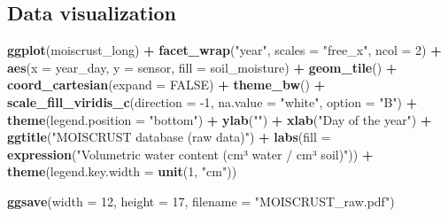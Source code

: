 \documentclass[]{article}
\newenvironment{Shaded}{\begin{snugshade}}{\end{snugshade}}
\newcommand{\DataTypeTok}[1]{\textcolor[rgb]{0.13,0.29,0.53}{#1}}
\newcommand{\DecValTok}[1]{\textcolor[rgb]{0.00,0.00,0.81}{#1}}
\newcommand{\KeywordTok}[1]{\textcolor[rgb]{0.13,0.29,0.53}{\textbf{#1}}}
\newcommand{\NormalTok}[1]{#1}
\newcommand{\OperatorTok}[1]{\textcolor[rgb]{0.81,0.36,0.00}{\textbf{#1}}}
\newcommand{\OtherTok}[1]{\textcolor[rgb]{0.56,0.35,0.01}{#1}}
\newcommand{\StringTok}[1]{\textcolor[rgb]{0.31,0.60,0.02}{#1}}
\begin{document}
\hypertarget{data-visualization}{%
\subsection{Data visualization}\label{data-visualization}}

\begin{Shaded}
\begin{Highlighting}[]
\KeywordTok{ggplot}\NormalTok{(moiscrust_long) }\OperatorTok{+}\StringTok{ }
\StringTok{  }\KeywordTok{facet_wrap}\NormalTok{(}\StringTok{"year"}\NormalTok{, }\DataTypeTok{scales =} \StringTok{"free_x"}\NormalTok{, }\DataTypeTok{ncol =} \DecValTok{2}\NormalTok{) }\OperatorTok{+}
\StringTok{  }\KeywordTok{aes}\NormalTok{(}\DataTypeTok{x =}\NormalTok{ year_day, }\DataTypeTok{y =}\NormalTok{ sensor, }\DataTypeTok{fill =}\NormalTok{ soil_moisture) }\OperatorTok{+}\StringTok{ }
\StringTok{  }\KeywordTok{geom_tile}\NormalTok{() }\OperatorTok{+}\StringTok{ }
\StringTok{  }\KeywordTok{coord_cartesian}\NormalTok{(}\DataTypeTok{expand =} \OtherTok{FALSE}\NormalTok{) }\OperatorTok{+}
\StringTok{  }\KeywordTok{theme_bw}\NormalTok{() }\OperatorTok{+}\StringTok{ }
\StringTok{  }\KeywordTok{scale_fill_viridis_c}\NormalTok{(}\DataTypeTok{direction =} \DecValTok{-1}\NormalTok{, }\DataTypeTok{na.value =} \StringTok{"white"}\NormalTok{, }\DataTypeTok{option =} \StringTok{"B"}\NormalTok{) }\OperatorTok{+}\StringTok{ }
\StringTok{  }\KeywordTok{theme}\NormalTok{(}\DataTypeTok{legend.position =} \StringTok{"bottom"}\NormalTok{) }\OperatorTok{+}\StringTok{ }
\StringTok{  }\KeywordTok{ylab}\NormalTok{(}\StringTok{""}\NormalTok{) }\OperatorTok{+}\StringTok{ }
\StringTok{  }\KeywordTok{xlab}\NormalTok{(}\StringTok{"Day of the year"}\NormalTok{) }\OperatorTok{+}
\StringTok{  }\KeywordTok{ggtitle}\NormalTok{(}\StringTok{"MOISCRUST database (raw data)"}\NormalTok{) }\OperatorTok{+}
\StringTok{  }\KeywordTok{labs}\NormalTok{(}\DataTypeTok{fill =} \KeywordTok{expression}\NormalTok{(}\StringTok{"Volumetric water content (cm³ water / cm³ soil)"}\NormalTok{)) }\OperatorTok{+}\StringTok{ }
\StringTok{  }\KeywordTok{theme}\NormalTok{(}\DataTypeTok{legend.key.width =} \KeywordTok{unit}\NormalTok{(}\DecValTok{1}\NormalTok{, }\StringTok{"cm"}\NormalTok{))}

\KeywordTok{ggsave}\NormalTok{(}\DataTypeTok{width =} \DecValTok{12}\NormalTok{, }\DataTypeTok{height =} \DecValTok{17}\NormalTok{, }\DataTypeTok{filename =} \StringTok{"MOISCRUST_raw.pdf"}\NormalTok{)}
\end{Highlighting}
\end{Shaded}
\end{document}
